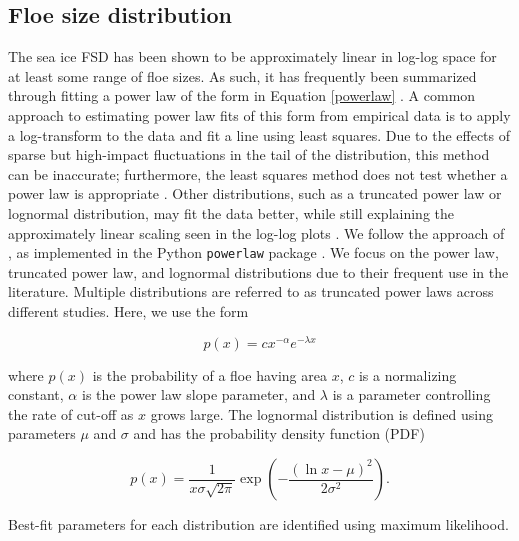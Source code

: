 \documentclass[aog]{igs}
\begin{document}
\subsection{Floe size distribution}
The sea ice FSD has been shown to be approximately linear in log-log space for at least some range of floe sizes. 
As such, it has frequently been summarized through fitting a power law of the form in Equation \ref{powerlaw} \citep{rothrock1984_MeasuringSea, stern2018_ReconcilingDisparate}.
A common approach to estimating power law fits of this form from empirical data is to apply a log-transform to the data and fit a line using least squares.
Due to the effects of sparse but high-impact fluctuations in the tail of the distribution, this method can be inaccurate; furthermore, the least squares method does not test whether a power law is appropriate \citep{clauset2009_PowerLawDistributions, bauke2007_ParameterEstimation, goldstein2004_ProblemsFitting}.
Other distributions, such as a truncated power law or lognormal distribution, may fit the data better, while still explaining the approximately linear scaling seen in the log-log plots \citep[e.g.,][]{toyota2006_CharacteristicsSea, herman2010_SeaiceFloesize, burroughs2001_UppertruncatedPower,montiel2022_TheoreticalFrameworka, lu2008_AerialObservations}.
We follow the approach of \cite{clauset2009_PowerLawDistributions}, as implemented in the Python \texttt{powerlaw} package \citep{alstott2014_PowerlawPython}.
We focus on the power law, truncated power law, and lognormal distributions due to their frequent use in the literature. Multiple distributions are referred to as truncated power laws across different studies. Here, we use the form
\begin{linenomath*}
\begin{equation}
    p(x) = cx^{-\alpha}e^{-\lambda x} \label{truncpowerlaw}
\end{equation}
\end{linenomath*}
where $p(x)$ is the probability of a floe having area $x$, $c$ is a normalizing constant, $\alpha$ is the power law slope parameter, and $\lambda$ is a parameter controlling the rate of cut-off as $x$ grows large. The lognormal distribution is defined using parameters $\mu$ and $\sigma$ and has the probability density function (PDF)
\begin{linenomath*}
    \begin{equation}
        p(x) = \frac{1}{x\sigma\sqrt{2\pi}}\exp\left(-\frac{(\ln x - \mu)^2}{2\sigma^2}\right).
    \end{equation}
\end{linenomath*}
Best-fit parameters for each distribution are identified using maximum likelihood.
\end{document}
